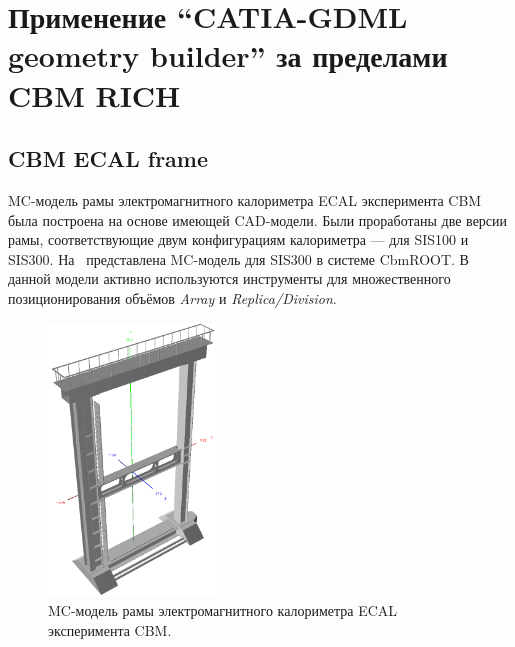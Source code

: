 
\section{Применение ``CATIA-GDML geometry builder'' за пределами CBM RICH}\label{sec:secBuilderOtherUsage}

\subsection{CBM ECAL frame}\label{sec:secCbmEcalFrame}

MC-модель рамы электромагнитного калориметра ECAL эксперимента CBM была построена на основе имеющей CAD-модели. Были проработаны две версии рамы, соответствующие двум конфигурациям калориметра --- для SIS100 и SIS300. На~ представлена MC-модель для SIS300 в системе CbmROOT. В данной модели активно используются инструменты для множественного позиционирования объёмов \textit{Array} и \textit{Replica/Division}.


\begin{figure}[H]
\centering
\includegraphics[width=0.4\textwidth]{pictures/CBM_ECAL_frame.png}
\caption{MC-модель рамы электромагнитного калориметра ECAL эксперимента CBM.}
\label{fig:CbmEcalFrame}
\end{figure}

